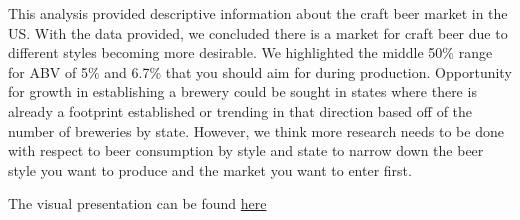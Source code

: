 \documentclass[]{article}
\begin{document}
This analysis provided descriptive information about the craft beer
market in the US. With the data provided, we concluded there is a market
for craft beer due to different styles becoming more desirable. We
highlighted the middle 50\% range for ABV of 5\% and 6.7\% that you
should aim for during production. Opportunity for growth in establishing
a brewery could be sought in states where there is already a footprint
established or trending in that direction based off of the number of
breweries by state. However, we think more research needs to be done
with respect to beer consumption by style and state to narrow down the
beer style you want to produce and the market you want to enter first.

The visual presentation can be found
\href{https://prezi.com/view/VWmVoDECGF76IKWRVCiR/}{here}
\end{document}
